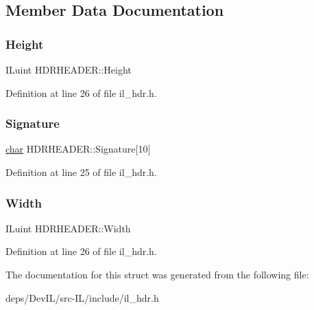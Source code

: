 \subsection{Member Data Documentation}
\mbox{\label{structHDRHEADER_a3efe6fd72775bf1fcf2ac9010732b851}} 
\subsubsection{\texorpdfstring{Height}{Height}}
{\footnotesize\ttfamily I\+Luint H\+D\+R\+H\+E\+A\+D\+E\+R\+::\+Height}



Definition at line 26 of file il\+\_\+hdr.\+h.

\mbox{\label{structHDRHEADER_aa98220223d3ab33d9203a7fe0dc2ba3b}} 
\subsubsection{\texorpdfstring{Signature}{Signature}}
{\footnotesize\ttfamily \hyperlink{classchar}{char} H\+D\+R\+H\+E\+A\+D\+E\+R\+::\+Signature\mbox{[}10\mbox{]}}



Definition at line 25 of file il\+\_\+hdr.\+h.

\mbox{\label{structHDRHEADER_abb591ce14fac026e0adcb8d6c96c6da9}} 
\subsubsection{\texorpdfstring{Width}{Width}}
{\footnotesize\ttfamily I\+Luint H\+D\+R\+H\+E\+A\+D\+E\+R\+::\+Width}



Definition at line 26 of file il\+\_\+hdr.\+h.



The documentation for this struct was generated from the following file\+:\begin{DoxyCompactItemize}
\item 
deps/\+Dev\+I\+L/src-\/\+I\+L/include/il\+\_\+hdr.\+h\end{DoxyCompactItemize}
